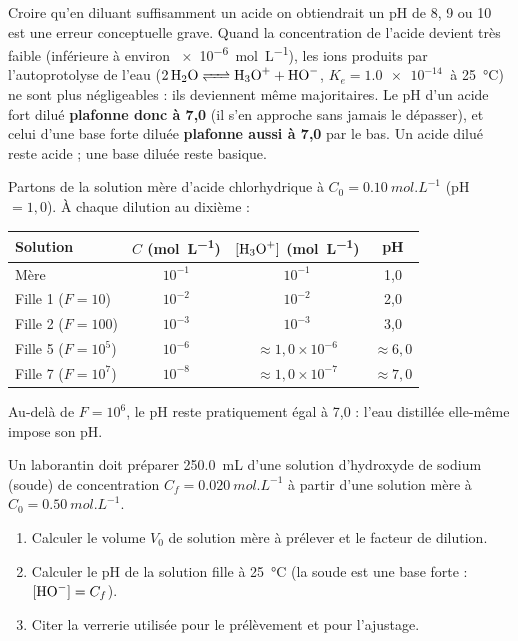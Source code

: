 \documentclass[11pt]{article}
\newcommand{\cle}[1]{{\popxbold\color{popdark}#1}}
\begin{document}
\begin{attention}
Croire qu'en diluant suffisamment un acide on obtiendrait un pH de 8, 9 ou 10 est une erreur conceptuelle grave. Quand la concentration de l'acide devient très faible (inférieure à environ \SI{e-6}{mol.L^{-1}}), les ions  produits par l'\cle{autoprotolyse de l'eau} ($\ce{2 H2O <=> H3O+ + HO-}$, $K_e = \SI{1,0e-14}{}$ à \SI{25}{\celsius}) ne sont plus négligeables : ils deviennent même majoritaires. Le pH d'un acide fort dilué \textbf{plafonne donc à 7,0} (il s'en approche sans jamais le dépasser), et celui d'une base forte diluée \textbf{plafonne aussi à 7,0} par le bas. Un acide dilué reste acide ; une base diluée reste basique.
\end{attention}

\begin{exemplebox}
Partons de la solution mère d'acide chlorhydrique à $C_0 = \SI{0,10}{mol.L^{-1}}$ (pH $= 1{,}0$). À chaque dilution au dixième :
\begin{center}
\begin{tabularx}{\linewidth}{|l|c|c|c|}
\hline
\rowcolor{popblueL} \textbf{Solution} & $C$ (\si{mol.L^{-1}}) & $[\ce{H3O+}]$ (\si{mol.L^{-1}}) & \textbf{pH} \\
\hline
Mère & $10^{-1}$ & $10^{-1}$ & 1,0 \\
\hline
Fille 1 ($F=10$) & $10^{-2}$ & $10^{-2}$ & 2,0 \\
\hline
Fille 2 ($F=100$) & $10^{-3}$ & $10^{-3}$ & 3,0 \\
\hline
Fille 5 ($F=10^{5}$) & $10^{-6}$ & $\approx 1,0 \times 10^{-6}$ & $\approx 6{,}0$ \\
\hline
Fille 7 ($F=10^{7}$) & $10^{-8}$ & $\approx 1,0 \times 10^{-7}$ & $\approx 7{,}0$ \\
\hline
\end{tabularx}
\end{center}
Au-delà de $F = 10^{6}$, le pH reste pratiquement égal à 7,0 : l'eau distillée elle-même impose son pH.
\end{exemplebox}

\begin{exercice}
Un laborantin doit préparer \SI{250,0}{mL} d'une solution d'hydroxyde de sodium (soude) de concentration $C_f = \SI{0,020}{mol.L^{-1}}$ à partir d'une solution mère à $C_0 = \SI{0,50}{mol.L^{-1}}$.
\begin{enumerate}
\item Calculer le volume $V_0$ de solution mère à prélever et le facteur de dilution.
\item Calculer le pH de la solution fille à \SI{25}{\celsius} (la soude est une base forte : $[\ce{HO-}] = C_f$).
\item Citer la verrerie utilisée pour le prélèvement et pour l'ajustage.
\end{enumerate}
\end{exercice}
\end{document}
